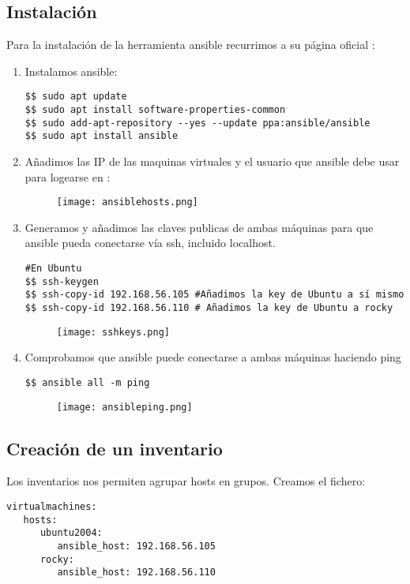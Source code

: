 \subsection{Instalación}
Para la instalación de la herramienta ansible recurrimos a su página oficial \cite{ansibleinstall}:
\begin{enumerate}
	\item Instalamos ansible:
	\begin{verbatim}
$$ sudo apt update
$$ sudo apt install software-properties-common
$$ sudo add-apt-repository --yes --update ppa:ansible/ansible
$$ sudo apt install ansible
	\end{verbatim}
	
	\item Añadimos las IP de las maquinas virtuales y el usuario que ansible debe usar para logearse en :
	\begin{figure}[H]
		\centering
		\texttt{[image: ansiblehosts.png]} 
	\end{figure}

	\item Generamos y añadimos las claves publicas de ambas máquinas para que ansible pueda conectarse vía ssh, incluido localhost.
\begin{verbatim}
#En Ubuntu
$$ ssh-keygen
$$ ssh-copy-id 192.168.56.105 #Añadimos la key de Ubuntu a sí mismo
$$ ssh-copy-id 192.168.56.110 # Añadimos la key de Ubuntu a rocky
\end{verbatim}

\begin{figure}[H]
	\centering
	\texttt{[image: sshkeys.png]} 
\end{figure}

	\item Comprobamos que ansible puede conectarse a ambas máquinas haciendo ping
\begin{verbatim}
$$ ansible all -m ping
\end{verbatim}

\begin{figure}[H]
	\centering
	\texttt{[image: ansibleping.png]} 
\end{figure}
\end{enumerate}

\subsection{Creación de un inventario \cite{ansibleguide}}
Los inventarios nos permiten agrupar hosts en grupos.
Creamos el fichero: 
\begin{verbatim}
virtualmachines:
   hosts:
      ubuntu2004:
         ansible_host: 192.168.56.105
      rocky:
         ansible_host: 192.168.56.110
\end{verbatim}

